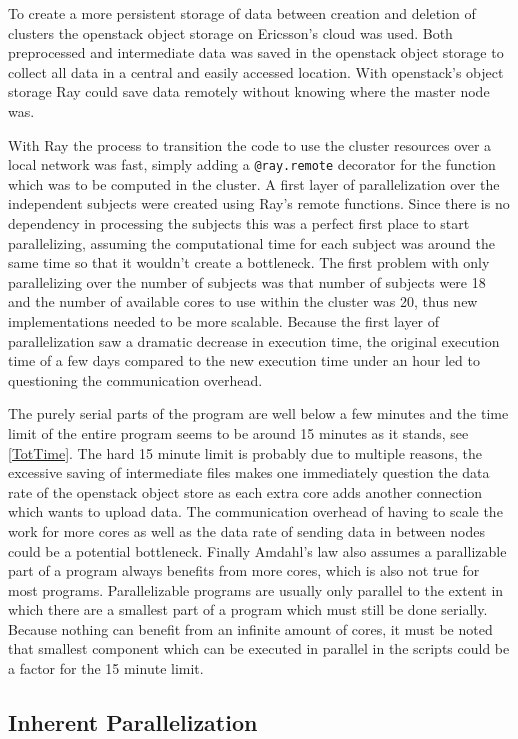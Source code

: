 \documentclass[12pt, a4paper]{article}
\begin{document}
To create a more persistent storage of data between creation and deletion of clusters the openstack object storage on Ericsson's cloud was used.
Both preprocessed and intermediate data was saved in the openstack object storage to collect all data in a central and easily accessed location.
With openstack's object storage Ray could save data remotely without knowing where the master node was.

With Ray the process to transition the code to use the cluster resources over a local network was fast, simply adding a \texttt{@ray.remote} decorator for the function which was to be computed in the cluster.
A first layer of parallelization over the independent subjects were created using Ray's remote functions.
Since there is no dependency in processing the subjects this was a perfect first place to start parallelizing, assuming the computational time for each subject was around the same time so that it wouldn't create a bottleneck.
The first problem with only parallelizing over the number of subjects was that number of subjects were 18 and the number of available cores to use within the cluster was 20, thus new implementations needed to be more scalable.
Because the first layer of parallelization saw a dramatic decrease in execution time, the original execution time of a few days compared to the new execution time under an hour led to questioning the communication overhead.

The purely serial parts of the program are well below a few minutes and the time limit of the entire program seems to be around 15 minutes as it stands, see \cref{TotTime}.
The hard 15 minute limit is probably due to multiple reasons, the excessive saving of intermediate files makes one immediately question the data rate of the openstack object store as each extra core adds another connection which wants to upload data. 
The communication overhead of having to scale the work for more cores as well as the data rate of sending data in between nodes could be a potential bottleneck.
Finally Amdahl's law also assumes a parallizable part of a program always benefits from more cores, which is also not true for most programs.
Parallelizable programs are usually only parallel to the extent in which there are a smallest part of a program which must still be done serially.
Because nothing can benefit from an infinite amount of cores, it must be noted that smallest component which can be executed in parallel in the scripts could be a factor for the 15 minute limit.

\subsection{Inherent Parallelization}\label{inPara}
\end{document}
